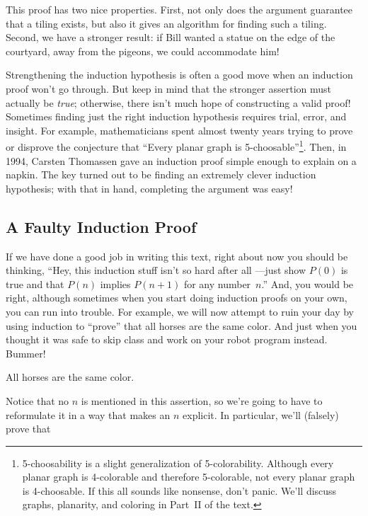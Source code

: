 This proof has two nice properties.  First, not only does the argument
guarantee that a tiling exists, but also it gives an algorithm for
finding such a tiling.  Second, we have a stronger result: if Bill
wanted a statue on the edge of the courtyard, away from the pigeons,
we could accommodate him!

Strengthening the induction hypothesis is often a good move when an
induction proof won't go through.  But keep in mind that the stronger
assertion must actually be \emph{true}; otherwise, there isn't much hope
of constructing a valid proof!  Sometimes finding just the right induction
hypothesis requires trial, error, and insight.  For example,
mathematicians spent almost twenty years trying to prove or disprove the
conjecture that ``Every planar graph is
5-choosable''\footnote{5-choosability is a slight generalization of
  5-colorability.  Although every planar graph is 4-colorable and
  therefore 5-colorable, not every planar graph is 4-choosable.  If this
  all sounds like nonsense, don't panic.  We'll discuss graphs, planarity,
  and coloring in Part~II of the text.}.  Then, in 1994, Carsten Thomassen
gave an induction proof simple enough to explain on a napkin.  The key
turned out to be finding an extremely clever induction hypothesis; with
that in hand, completing the argument was easy!

\fi  %

\subsection{A Faulty Induction Proof}

If we have done a good job in writing this text, right about now you
should be thinking, ``Hey, this induction stuff isn't so hard after
all ---just show $P(0)$ is true and that $P(n)$ implies $P(n+1)$ for
any number~$n$.''  And, you would be right, although sometimes when
you start doing induction proofs on your own, you can run into
trouble.  For example, we will now attempt to ruin your day by using
induction to ``prove'' that all horses are the same color.  And just
when you thought it was safe to skip class and work on your robot
program instead.  Bummer!

\begin{falsethm*}
All horses are the same color.
\end{falsethm*}

Notice that no $n$ is mentioned in this assertion, so we're going to have
to reformulate it in a way that makes an $n$ explicit.  In particular,
we'll (falsely) prove that

